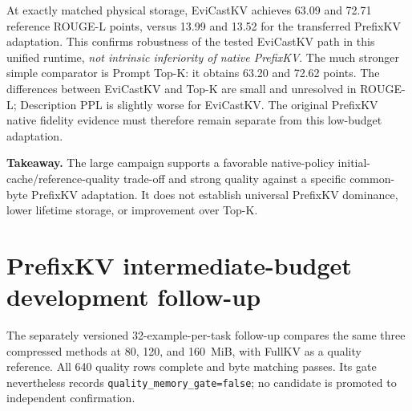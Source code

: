 \documentclass[10pt,letterpaper]{article}
\newcommand{\Evi}{EviCastKV}
\newcommand{\resulttable}[2]{\begin{center}\small\begin{adjustbox}{max width=#1}\end{adjustbox}\end{center}}
\newcommand{\takeaway}[1]{\par\smallskip\noindent\textbf{Takeaway.} #1\par\smallskip}
\begin{document}
At exactly matched physical storage, \Evi{} achieves 63.09 and 72.71
reference ROUGE-L points, versus 13.99 and 13.52 for the transferred
PrefixKV adaptation. This confirms robustness of the tested \Evi{} path
in this unified runtime, \emph{not intrinsic inferiority of native PrefixKV}.
The much stronger simple comparator is Prompt Top-K: it obtains 63.20
and 72.62 points. The differences between \Evi{} and Top-K are small and
unresolved in ROUGE-L; Description PPL is slightly worse for \Evi.
The original PrefixKV native fidelity evidence must therefore remain
separate from this low-budget adaptation.

\begin{table}[htbp]
\caption{\Evi{} minus PrefixKV: aggregate point differences and stored
ordinary paired 95\% intervals, 10,000 replicates. PPL favors negative;
R-L favors positive. The stored interval artifact is preserved without
claiming family-wise correction. Small discrepancies between its stored
bootstrap center and the aggregate point difference are not silently
replaced; only aggregate differences and interval endpoints are shown.}
\label{tab:prefixci}
\resulttable{\linewidth}{prefix_intervals}
\end{table}

\takeaway{The large campaign supports a favorable native-policy
initial-cache/reference-quality trade-off and strong quality against a
specific common-byte PrefixKV adaptation. It does not establish universal
PrefixKV dominance, lower lifetime storage, or improvement over Top-K.}

\section{PrefixKV intermediate-budget development follow-up}
\label{sec:intermediate}
The separately versioned 32-example-per-task follow-up compares the same
three compressed methods at 80, 120, and 160~MiB, with FullKV as a quality
reference. All 640 quality rows complete and byte matching passes. Its
gate nevertheless records \texttt{quality\_memory\_gate=false}; no candidate
is promoted to independent confirmation.
\end{document}
